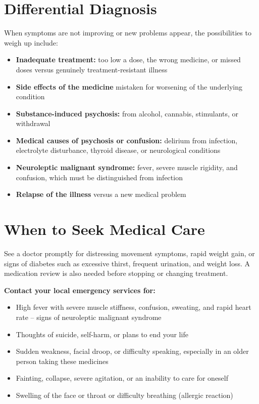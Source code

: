 \section*{Differential Diagnosis}
When symptoms are not improving or new problems appear, the possibilities to weigh up include:

\begin{itemize}
    \item \textbf{Inadequate treatment:} too low a dose, the wrong medicine, or missed doses versus genuinely treatment-resistant illness
    \item \textbf{Side effects of the medicine} mistaken for worsening of the underlying condition
    \item \textbf{Substance-induced psychosis:} from alcohol, cannabis, stimulants, or withdrawal
    \item \textbf{Medical causes of psychosis or confusion:} delirium from infection, electrolyte disturbance, thyroid disease, or neurological conditions
    \item \textbf{Neuroleptic malignant syndrome:} fever, severe muscle rigidity, and confusion, which must be distinguished from infection
    \item \textbf{Relapse of the illness} versus a new medical problem
\end{itemize}

\section*{When to Seek Medical Care}
See a doctor promptly for distressing movement symptoms, rapid weight gain, or signs of diabetes such as excessive thirst, frequent urination, and weight loss. A medication review is also needed before stopping or changing treatment.

\textbf{Contact your local emergency services for:}
\begin{itemize}
    \item High fever with severe muscle stiffness, confusion, sweating, and rapid heart rate -- signs of neuroleptic malignant syndrome
    \item Thoughts of suicide, self-harm, or plans to end your life
    \item Sudden weakness, facial droop, or difficulty speaking, especially in an older person taking these medicines
    \item Fainting, collapse, severe agitation, or an inability to care for oneself
    \item Swelling of the face or throat or difficulty breathing (allergic reaction)
\end{itemize}

